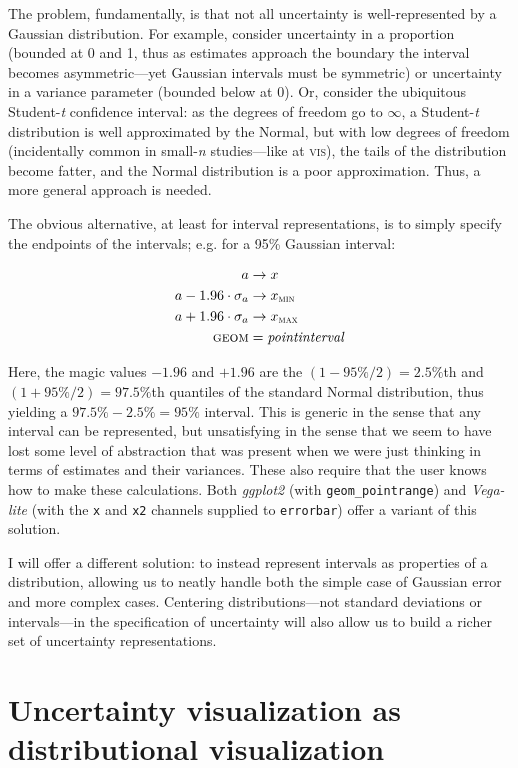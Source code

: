 \documentclass[journal]{vgtc}                     %
\begin{document}
The problem, fundamentally, is that not all uncertainty is well-represented by a Gaussian distribution. For example, consider uncertainty in a proportion (bounded at 0 and 1, thus as estimates approach the boundary the interval becomes asymmetric---yet Gaussian intervals must be symmetric) or uncertainty in a variance parameter (bounded below at 0). Or, consider the ubiquitous Student-\textit{t} confidence interval: as the degrees of freedom go to $\infty$, a Student-\textit{t} distribution is well approximated by the Normal, but with low degrees of freedom (incidentally common in small-\textit{n} studies---like at \textsc{vis}), the tails of the distribution become fatter, and the Normal distribution is a poor approximation. Thus, a more general approach is needed.

The obvious alternative, at least for interval representations, is to simply specify the endpoints of the intervals; e.g. for a 95\% Gaussian interval:

\begin{align*}
a &\rightarrow x\\
a - 1.96 \cdot \sigma_a &\rightarrow x_\textsc{min}\\
a + 1.96 \cdot \sigma_a &\rightarrow x_\textsc{max}\\
\textsc{geom} &= \mathit{pointinterval}
\end{align*}

Here, the magic values $-1.96$ and $+1.96$ are the $(1-95\%/2) = 2.5\%$th and $(1+95\%/2) = 97.5\%$th quantiles of the standard Normal distribution, thus yielding a $97.5\% - 2.5\% = 95\%$ interval. This is generic in the sense that any interval can be represented, but unsatisfying in the sense that we seem to have lost some level of abstraction that was present when we were just thinking in terms of estimates and their variances. These also require that the user knows how to make these calculations. Both \textit{ggplot2} (with \texttt{geom\_pointrange}) and \textit{Vega-lite} (with the \texttt{x} and \texttt{x2} channels supplied to \texttt{errorbar}) offer a variant of this solution. 

I will offer a different solution: to instead represent intervals as properties of a distribution, allowing us to neatly handle both the simple case of Gaussian error and more complex cases. Centering distributions---not standard deviations or intervals---in the specification of uncertainty will also allow us to build a richer set of uncertainty representations.

\section{Uncertainty visualization as distributional visualization}
\end{document}

